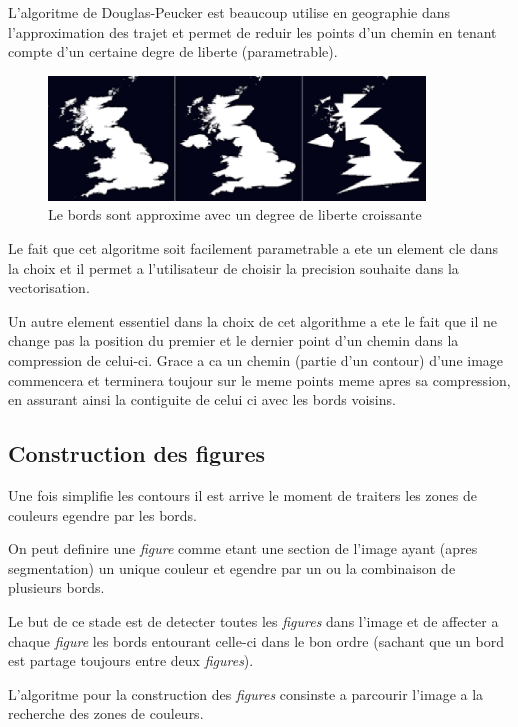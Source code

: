 \documentclass[twoside,openright,a4paper,11pt,french]{article}
\begin{document}
L'algoritme de Douglas-Peucker est beaucoup utilise en geographie dans
l'approximation des trajet et permet de reduir les points d'un chemin
en tenant compte d'un certaine degre de liberte (parametrable).

\begin{figure}[h]
\centering
\includegraphics[width=10cm]{./pics/dp1.eps}
\caption{Le bords sont approxime avec un degree de liberte croissante}
\label{fig:routcidr}
\end{figure}

Le fait que cet algoritme soit facilement parametrable a ete un
element cle dans la choix et il permet a l'utilisateur de choisir la
precision souhaite dans la vectorisation.

Un autre element essentiel dans la choix de cet algorithme a ete le
fait que il ne change pas la position du premier et le dernier point
d'un chemin dans la compression de celui-ci. Grace a ca un chemin
(partie d'un contour) d'une image commencera et terminera toujour sur
le meme points meme apres sa compression, en assurant ainsi la
contiguite de celui ci avec les bords voisins.



\subsection{Construction des figures}
Une fois simplifie les contours il est arrive le moment de traiters
les zones de couleurs egendre par les bords.

On peut definire une {\it figure} comme etant une section de l'image
ayant (apres segmentation) un unique couleur et egendre par un ou
la combinaison de plusieurs bords.

Le but de ce stade est de detecter toutes les {\it figures} dans l'image et
de affecter a chaque {\it figure} les bords entourant celle-ci dans le
bon ordre (sachant que un bord est partage toujours entre deux
{\it figures}).

L'algoritme pour la construction des {\it figures} consinste a parcourir
l'image a la recherche des zones de couleurs. 
\end{document}
